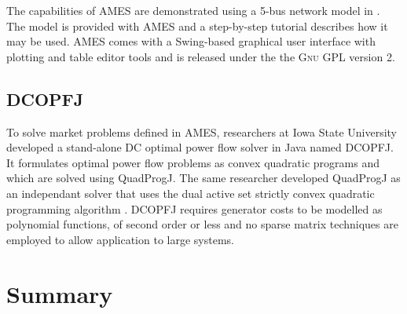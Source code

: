 The capabilities of AMES are demonstrated using a 5-bus network model in
\cite{tesfatsi:pes09}.  The model is provided with AMES and a step-by-step
tutorial describes how it may be used.  AMES comes with a
Swing-based graphical user interface with plotting and table editor tools and
is released under the the \textsc{Gnu} GPL version 2.

\subsection*{DCOPFJ}
\label{sec:dcopfj}
To solve market problems defined in AMES, researchers at Iowa State University
developed a stand-alone DC optimal power flow solver in Java named DCOPFJ.
It formulates optimal power flow problems as convex quadratic programs and
which are solved using QuadProgJ.  The same researcher developed QuadProgJ as
an independant solver that uses the dual active set strictly convex quadratic
programming algorithm \cite{goldfarb:scqp}.  DCOPFJ requires
generator costs to be modelled as polynomial functions, of second order or
less and no sparse matrix techniques are employed to allow application to large
systems.


\section{Summary}
